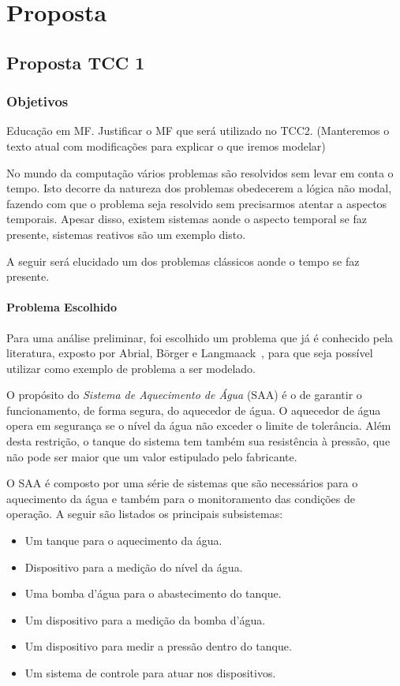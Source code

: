 \section{Proposta}
\subsection{Proposta TCC 1}
\subsubsection{Objetivos}

Educação em MF.
Justificar o MF que será utilizado no TCC2.
(Manteremos o texto atual com modificações para explicar o que iremos modelar)

No mundo da computação vários problemas são resolvidos sem levar em conta o tempo.
Isto decorre da natureza dos problemas obedecerem a lógica não modal, fazendo com que o
problema seja resolvido sem precisarmos atentar a aspectos temporais. Apesar disso,
existem sistemas aonde o aspecto temporal se faz presente, sistemas reativos são um exemplo disto.

A seguir será elucidado um dos problemas clássicos aonde o tempo se faz presente.
\paragraph{Problema Escolhido}
Para uma análise preliminar, foi escolhido um problema que já é conhecido pela literatura, exposto
por Abrial, B\"{o}rger e Langmaack~\cite{opac-b1092561}, para que seja possível utilizar como exemplo
de problema a ser modelado.

O propósito do \textit{Sistema de Aquecimento de Água} (SAA) é o de garantir o funcionamento,
de forma segura, do aquecedor de água. O aquecedor de água opera em segurança se o nível da água
não exceder o limite de tolerância. Além desta restrição, o tanque do sistema tem também
sua resistência à pressão, que não pode ser maior que um valor estipulado pelo fabricante.

O SAA é composto por uma série de sistemas que são necessários para o aquecimento da água e também
para o monitoramento das condições de operação. A seguir são listados os principais subsistemas:
\begin{itemize}
\item Um tanque para o aquecimento da água.
\item Dispositivo para a medição do nível da água.
\item Uma bomba d'água para o abastecimento do tanque.
\item Um dispositivo para a medição da bomba d'água.
\item Um dispositivo para medir a pressão dentro do tanque.
\item Um sistema de controle para atuar nos dispositivos.
\end{itemize}

